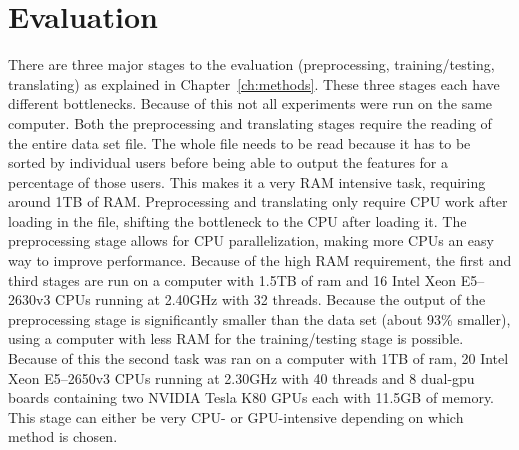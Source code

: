 \chapter{Evaluation}\label{ch:evaluation}

There are three major stages to the evaluation (preprocessing, training/testing, translating) as explained in Chapter~\ref{ch:methods}. These three stages each have different bottlenecks. Because of this not all experiments were run on the same computer. Both the preprocessing and translating stages require the reading of the entire data set file. The whole file needs to be read because it has to be sorted by individual users before being able to output the features for a percentage of those users. This makes it a very RAM intensive task, requiring around 1TB of RAM. Preprocessing and translating only require CPU work after loading in the file, shifting the bottleneck to the CPU after loading it. The preprocessing stage allows for CPU parallelization, making more CPUs an easy way to improve performance. Because of the high RAM requirement, the first and third stages are run on a computer with 1.5TB of ram and 16 Intel Xeon E5--2630v3 CPUs running at 2.40GHz with 32 threads. Because the output of the preprocessing stage is significantly smaller than the data set (about 93\% smaller), using a computer with less RAM for the training/testing stage is possible. Because of this the second task was ran on a computer with 1TB of ram, 20 Intel Xeon E5--2650v3 CPUs running at 2.30GHz with 40 threads and 8 dual-gpu boards containing two NVIDIA Tesla K80 GPUs each with 11.5GB of memory. This stage can either be very CPU- or GPU-intensive depending on which method is chosen.

